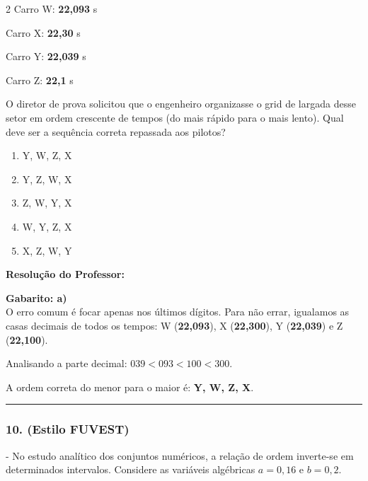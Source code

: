 \begin{multicols*}{2}
Carro W: \textbf{22,093} s

Carro X: \textbf{22,30} s

Carro Y: \textbf{22,039} s

Carro Z: \textbf{22,1} s

O diretor de prova solicitou que o engenheiro organizasse o grid de largada desse setor em ordem crescente de tempos (do mais rápido para o mais lento). Qual deve ser a sequência correta repassada aos pilotos?
\begin{enumerate}[label=\alph*), itemsep=\espacoAlt]
    \item Y, W, Z, X
    \item Y, Z, W, X
    \item Z, W, Y, X
    \item W, Y, Z, X
    \item X, Z, W, Y
\end{enumerate}

\ifgabarito
    \begin{tcolorbox}[colback=CorTitUm!5, colframe=CorTitUm, boxrule=1pt, arc=4pt, left=6pt, right=6pt, top=6pt, bottom=6pt]
    \small\textbf{\textcolor{CorTitUm}{Resolução do Professor:}}\par\vspace{0.1cm}
    \color{CinzaEscuro}
    \textbf{Gabarito: a)}\\
    O erro comum é focar apenas nos últimos dígitos. Para não errar, igualamos as casas decimais de todos os tempos: W (\textbf{22,093}), X (\textbf{22,300}), Y (\textbf{22,039}) e Z (\textbf{22,100}).
    
    Analisando a parte decimal: $039 < 093 < 100 < 300$.
    
    A ordem correta do menor para o maior é: \textbf{Y, W, Z, X}.
    \end{tcolorbox}
\fi

\par\vspace{\espacoQuestao}

\noindent\textcolor{CorLinha}{\rule{\linewidth}{0.5pt}} 
\par\vspace{\espacoPreQuestao}
\subsubsection*{10. (Estilo FUVEST)} - No estudo analítico dos conjuntos numéricos, a relação de ordem inverte-se em determinados intervalos. Considere as variáveis algébricas $ a = 0,16 $ e $ b = 0,2 $.


\end{multicols*}

